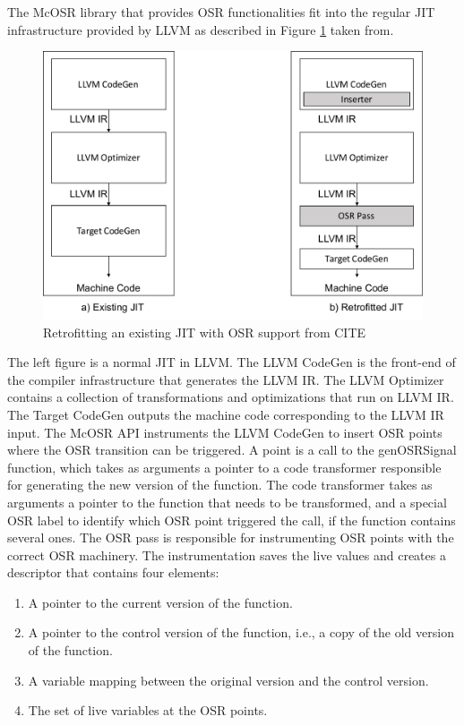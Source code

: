 The McOSR library that provides OSR functionalities fit into the regular JIT infrastructure provided by LLVM as described in Figure \ref{McOSRArchitecture} taken from\cite{lameed2013modular}. 
\begin{figure}[h]
\centering
\includegraphics[scale=0.5]{Figures/MCJitArchitecture}
\decoRule
\caption[Retrofitting an existing JIT with OSR support]{Retrofitting an existing JIT with OSR support from CITE}
\label{McOSRArchitecture}
\end{figure}
The left figure is a normal JIT in LLVM. 
The LLVM CodeGen is the front-end of the compiler infrastructure that generates the LLVM IR.
The LLVM Optimizer contains a collection of transformations and optimizations that run on LLVM IR. 
The Target CodeGen outputs the machine code corresponding to the LLVM IR input. 
The McOSR API instruments the LLVM CodeGen to insert OSR points where the OSR transition can be triggered. 
A point is a call to the genOSRSignal function, which takes as arguments a pointer to a code transformer responsible for generating the new version of the function.
The code transformer takes as arguments a pointer to the function that needs to be transformed, and a special OSR label to identify which OSR point triggered the call, if the function contains several ones.
The OSR pass is responsible for instrumenting OSR points with the correct OSR machinery.
The instrumentation saves the live values and creates a descriptor that contains four elements: 
\begin{enumerate}
    \item A pointer to the current version of the function. 
    \item A pointer to the control version of the function, i.e., a copy of the old version of the function.
    \item A variable mapping between the original version and the control version.
    \item The set of live variables at the OSR points. 
\end{enumerate}\\

